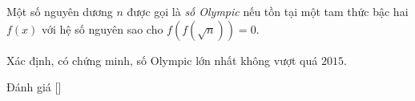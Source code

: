 \ifshowproblem
\begin{problem}\label{problem:RUS-2015-SMO-10-P4}
    Một số nguyên dương \( n \) được gọi là \textit{số Olympic} nếu tồn tại một tam thức bậc hai \( f(x) \) với hệ số nguyên 
    sao cho \( f(f(\sqrt{n})) = 0 \).
    
    Xác định, có chứng minh, số Olympic lớn nhất không vượt quá \( 2015 \).
\end{problem}
\fi

\ifshowinfo
Đánh giá [\textbf{}]\footnotemark
{}
\fi